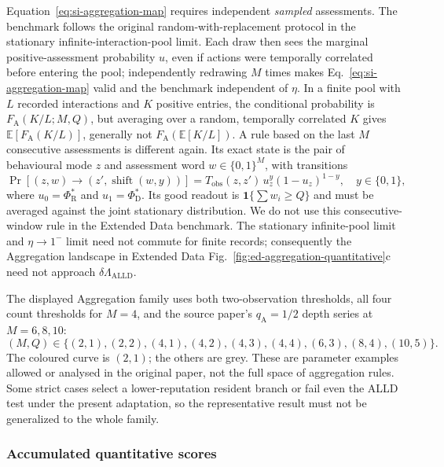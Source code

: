 \documentclass[fleqn,10pt]{wlscirep}
\begin{document}
Equation~\eqref{eq:si-aggregation-map} requires independent \emph{sampled} assessments. The benchmark follows the original random-with-replacement protocol in the stationary infinite-interaction-pool limit. Each draw then sees the marginal positive-assessment probability $u$, even if actions were temporally correlated before entering the pool; independently redrawing $M$ times makes Eq.~\eqref{eq:si-aggregation-map} valid and the benchmark independent of $\eta$. In a finite pool with $L$ recorded interactions and $K$ positive entries, the conditional probability is $F_{\mathrm A}(K/L;M,Q)$, but averaging over a random, temporally correlated $K$ gives $\mathbb E[F_{\mathrm A}(K/L)]$, generally not $F_{\mathrm A}(\mathbb E[K/L])$. A rule based on the last $M$ consecutive assessments is different again. Its exact state is the pair of behavioural mode $z$ and assessment word $w\in\{0,1\}^{M}$, with transitions
\begin{equation}
\Pr[(z,w)\to(z',\operatorname{shift}(w,y))]
=T_{\mathrm{obs}}(z,z')\,u_z^{y}(1-u_z)^{1-y},
\quad y\in\{0,1\},
\label{eq:si-aggregation-window-kernel}
\end{equation}
where $u_0=\Phi_{\mathrm R}^*$ and $u_1=\Phi_{\mathrm D}^*$. Its good readout is $\mathbf1\{\sum w_i\geq Q\}$ and must be averaged against the joint stationary distribution. We do not use this consecutive-window rule in the Extended Data benchmark. The stationary infinite-pool limit and $\eta\to1^{-}$ limit need not commute for finite records; consequently the Aggregation landscape in Extended Data Fig.~\ref{fig:ed-aggregation-quantitative}c need not approach $\delta\Lambda_{\mathrm{ALLD}}$.

The displayed Aggregation family uses both two-observation thresholds, all four count thresholds for $M=4$, and the source paper's $q_{\mathrm A}=1/2$ depth series at $M=6,8,10$:
\[
(M,Q)\in\{(2,1),(2,2),(4,1),(4,2),(4,3),(4,4),
(6,3),(8,4),(10,5)\}.
\]
The coloured curve is $(2,1)$; the others are grey. These are parameter examples allowed or analysed in the original paper, not the full space of aggregation rules. Some strict cases select a lower-reputation resident branch or fail even the ALLD test under the present adaptation, so the representative result must not be generalized to the whole family.

\subsubsection{Accumulated quantitative scores}
\label{sec:si-quantitative}
\end{document}
